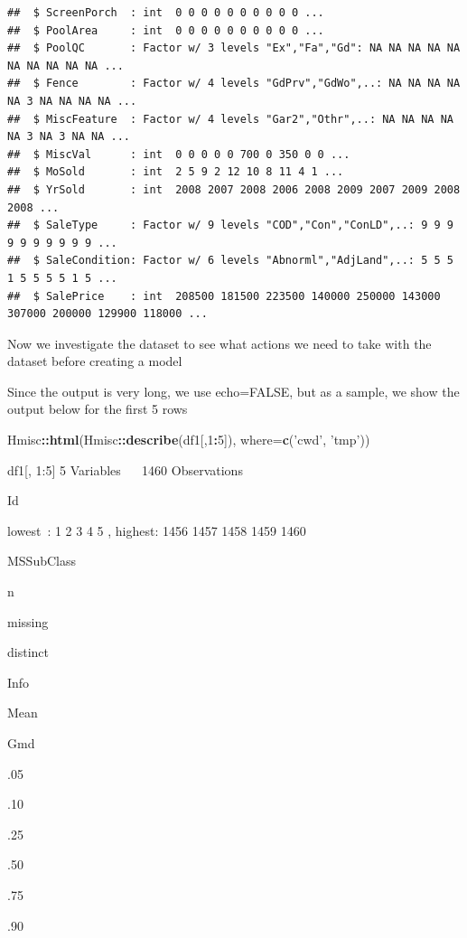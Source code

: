 \documentclass[
]{article}
\newenvironment{Shaded}{\begin{snugshade}}{\end{snugshade}}
\newcommand{\DataTypeTok}[1]{\textcolor[rgb]{0.13,0.29,0.53}{#1}}
\newcommand{\DecValTok}[1]{\textcolor[rgb]{0.00,0.00,0.81}{#1}}
\newcommand{\KeywordTok}[1]{\textcolor[rgb]{0.13,0.29,0.53}{\textbf{#1}}}
\newcommand{\NormalTok}[1]{#1}
\newcommand{\OperatorTok}[1]{\textcolor[rgb]{0.81,0.36,0.00}{\textbf{#1}}}
\newcommand{\StringTok}[1]{\textcolor[rgb]{0.31,0.60,0.02}{#1}}
\begin{document}
\begin{verbatim}
##  $ ScreenPorch  : int  0 0 0 0 0 0 0 0 0 0 ...
##  $ PoolArea     : int  0 0 0 0 0 0 0 0 0 0 ...
##  $ PoolQC       : Factor w/ 3 levels "Ex","Fa","Gd": NA NA NA NA NA NA NA NA NA NA ...
##  $ Fence        : Factor w/ 4 levels "GdPrv","GdWo",..: NA NA NA NA NA 3 NA NA NA NA ...
##  $ MiscFeature  : Factor w/ 4 levels "Gar2","Othr",..: NA NA NA NA NA 3 NA 3 NA NA ...
##  $ MiscVal      : int  0 0 0 0 0 700 0 350 0 0 ...
##  $ MoSold       : int  2 5 9 2 12 10 8 11 4 1 ...
##  $ YrSold       : int  2008 2007 2008 2006 2008 2009 2007 2009 2008 2008 ...
##  $ SaleType     : Factor w/ 9 levels "COD","Con","ConLD",..: 9 9 9 9 9 9 9 9 9 9 ...
##  $ SaleCondition: Factor w/ 6 levels "Abnorml","AdjLand",..: 5 5 5 1 5 5 5 5 1 5 ...
##  $ SalePrice    : int  208500 181500 223500 140000 250000 143000 307000 200000 129900 118000 ...
\end{verbatim}

Now we investigate the dataset to see what actions we need to take with the dataset before creating a model

Since the output is very long, we use echo=FALSE, but as a sample, we show the output below for the first 5 rows

\begin{Shaded}
\begin{Highlighting}[]
\NormalTok{Hmisc}\OperatorTok{::}\KeywordTok{html}\NormalTok{(Hmisc}\OperatorTok{::}\KeywordTok{describe}\NormalTok{(df1[,}\DecValTok{1}\OperatorTok{:}\DecValTok{5}\NormalTok{]), }\DataTypeTok{where=}\KeywordTok{c}\NormalTok{(}\StringTok{'cwd'}\NormalTok{, }\StringTok{'tmp'}\NormalTok{))}
\end{Highlighting}
\end{Shaded}

{df1{[}, 1:5{]} 5 Variables   1460 Observations}

{Id}

{lowest~: 1 2 3 4 5 , highest: 1456 1457 1458 1459 1460}

{MSSubClass}

n

missing

distinct

Info

Mean

Gmd

.05

.10

.25

.50

.75

.90
\end{document}
